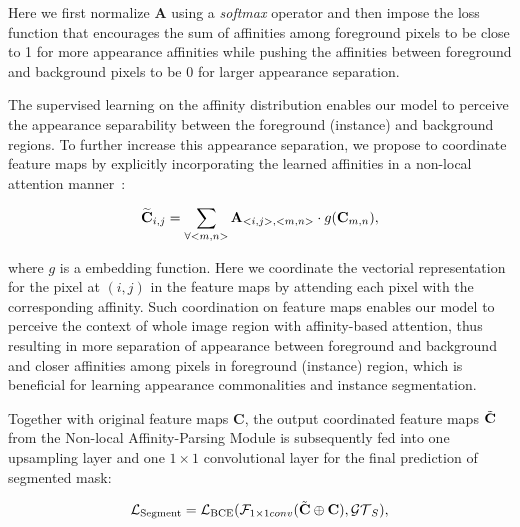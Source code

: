 \documentclass[runningheads]{llncs}
\begin{document}
\vspace{-2mm}\noindent
Here we first normalize $\mathbf{A}$ using a \emph{softmax} operator and then impose the loss function that encourages the sum of affinities among foreground pixels to be close to 1 for more appearance affinities while pushing the affinities between foreground and background pixels to be 0 for larger appearance separation.

The supervised learning on the affinity distribution enables our model to perceive the appearance separability between the foreground (instance) and background regions. To further increase this appearance separation, we propose to coordinate feature maps by explicitly incorporating the learned affinities in a non-local attention manner~\cite{wang2018non,pmlr-v97-zhang19f}:
\begin{small}
\begin{equation}
\vspace{-2mm}
    \widetilde{\mathbf{C}}_{i,j} = \sum_{\forall <m,n>} \mathbf{A}_{<i,j>,<m,n>} \cdot g(\mathbf{C}_{m,n}),
\end{equation}
\end{small}

\vspace{-1mm}\noindent
where $g$ is a embedding function. Here we coordinate the vectorial representation for the pixel at $(i,j)$ in the feature maps by attending each pixel with the corresponding  affinity. Such coordination on feature maps enables our model to perceive the context of whole image region with affinity-based attention, thus resulting in more separation of appearance between foreground and background and closer affinities among pixels in foreground (instance) region, which is beneficial for learning appearance commonalities and instance segmentation. 

Together with original feature maps $\mathbf{C}$, the output coordinated feature maps $\Tilde{\mathbf{C}}$ from the Non-local Affinity-Parsing Module is subsequently fed into one upsampling layer and one $1\times 1$ convolutional layer for the final prediction of segmented mask:
\begin{small}
\begin{equation}
\vspace{-2mm}
    \mathcal{L}_{\text{Segment}} = \mathcal{L}_{\text{BCE}}(\mathcal{F}_{1\times 1 conv}(\Tilde{\mathbf{C}} \oplus \mathbf{C}), \mathcal{GT}_{S}),
\end{equation}
\end{small}
\end{document}
